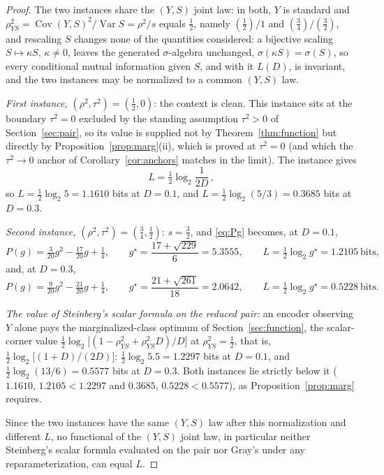 \documentclass[11pt,onecolumn]{IEEEtran}
\newcommand{\Cov}{\operatorname{Cov}}
\begin{document}
\begin{proof}
The two instances share the $(Y,S)$ joint law: in both, $Y$ is standard
and
$\rho_{YS}^2=\Cov(Y,S)^2/\operatorname{Var}S=\rho^2/s$ equals
$\tfrac12$, namely $(\tfrac12)/1$ and $(\tfrac34)/(\tfrac32)$, and
rescaling $S$ changes none of the quantities considered: a bijective
scaling $S\mapsto\kappa S$, $\kappa\ne0$, leaves the generated
$\sigma$-algebra unchanged, $\sigma(\kappa S)=\sigma(S)$, so every
conditional mutual information given $S$, and with it $L(D)$, is
invariant, and the two instances may be normalized to a common
$(Y,S)$ law.

\emph{First instance,} $(\rho^2,\tau^2)=(\tfrac12,0)$: the context is
clean. This instance sits at the boundary $\tau^2=0$ excluded by the
standing assumption $\tau^2>0$ of Section~\ref{sec:pair}, so its value
is supplied not by Theorem~\ref{thm:function} but directly by
Proposition~\ref{prop:marg}(ii), which is proved at $\tau^2=0$ (and
which the $\tau^2\to0$ anchor of Corollary~\ref{cor:anchors} matches
in the limit). The instance gives
\[
L=\tfrac12\log_2\frac{1}{2D}\,,
\]
so $L=\tfrac12\log_2 5=1.1610$ bits
at $D=0.1$, and $L=\tfrac12\log_2(5/3)=0.3685$ bits at $D=0.3$.

\emph{Second instance,} $(\rho^2,\tau^2)=(\tfrac34,\tfrac12)$:
$s=\tfrac32$, and \eqref{eq:Pg} becomes, at $D=0.1$,
\[
P(g)=\tfrac{3}{20}g^2-\tfrac{17}{20}g+\tfrac14,
\qquad
g^\star=\frac{17+\sqrt{229}}{6}=5.3555,
\qquad
L=\tfrac12\log_2 g^\star=1.2105\ \text{bits},
\]
and, at $D=0.3$,
\[
P(g)=\tfrac{9}{20}g^2-\tfrac{21}{20}g+\tfrac14,
\qquad
g^\star=\frac{21+\sqrt{261}}{18}=2.0642,
\qquad
L=\tfrac12\log_2 g^\star=0.5228\ \text{bits}.
\]

\emph{The value of Steinberg's scalar formula on the reduced pair:} an
encoder observing $Y$
alone pays the marginalized-class optimum of
Section~\ref{sec:function}, the scalar-corner value
$\tfrac12\log_2\bigl[(1-\rho_{YS}^2+\rho_{YS}^2D)/D\bigr]$ at
$\rho_{YS}^2=\tfrac12$, that is,
$\tfrac12\log_2\bigl[(1+D)/(2D)\bigr]$: $\tfrac12\log_2 5.5=1.2297$
bits at $D=0.1$, and $\tfrac12\log_2(13/6)=0.5577$ bits at $D=0.3$.
Both instances lie strictly below it ($1.1610,\,1.2105<1.2297$ and
$0.3685,\,0.5228<0.5577$), as Proposition~\ref{prop:marg} requires.

Since the two instances have the same $(Y,S)$ law after this
normalization and different $L$, no functional of the $(Y,S)$ joint
law, in particular neither Steinberg's scalar formula evaluated on the
pair nor Gray's under any reparameterization, can equal $L$.
\end{proof}
\end{document}
